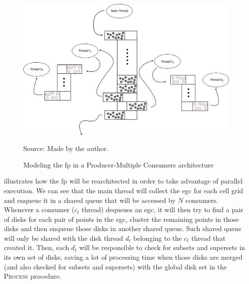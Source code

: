 \begin{figure}[h!]
    \centering
    \caption{Modeling the \ac{fp} in a Producer-Multiple Consumers architecture}
    \centerline{\includegraphics[width=\linewidth]{images/multithread.png}}
    \footnotesize{Source: Made by the author.}
    \label{fig:multithread}
\end{figure}

 illustrates how the \ac{fp} will be rearchitected in order to take advantage of parallel
execution.  We can see that the main thread will collect the \ac{egc} for each cell grid and enqueue it in a shared
queue that will be accessed by $N$ consumers. Whenever a consumer ($c_t$ thread) dequeues an \ac{egc}, it will then try
to find a pair of disks for each pair of points in the \ac{egc}, cluster the remaining points in those disks and then
enqueue those disks in another shared queue. Such shared queue will only be shared with the disk thread $d_t$ belonging
to the $c_t$ thread that created it. Then, each $d_t$ will be responsible to check for subsets and supersets in its own
set of disks, saving a lot of processing time when those disks are merged (and also checked for subsets and supersets)
with the global disk set in the \textsc{Process} procedure.
